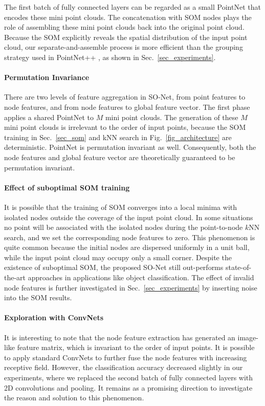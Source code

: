 \documentclass[10pt,twocolumn,letterpaper]{article}
\begin{document}
The first batch of fully connected layers can be regarded as a small PointNet that encodes these mini point clouds. The concatenation with SOM nodes plays the role of assembling these mini point clouds back into the original point cloud. Because the SOM explicitly reveals the spatial distribution of the input point cloud, our separate-and-assemble process is more efficient than the grouping strategy used in PointNet++ \cite{qi2017pointnet++}, as shown in Sec.~\ref{sec_experiments}.

\paragraph{Permutation Invariance}
There are two levels of feature aggregation in SO-Net, from point features to node features, and from node features to global feature vector. The first phase applies a shared PointNet to $M$ mini point clouds. The generation of these $M$ mini point clouds is irrelevant to the order of input points, because the SOM training in Sec.~\ref{sec_som} and kNN search in Fig.~\ref{fig_architecture} are deterministic. PointNet \cite{qi2016pointnet} is permutation invariant as well. Consequently, both the node features and global feature vector are theoretically guaranteed to be permutation invariant.

\paragraph{Effect of suboptimal SOM training}
It is possible that the training of SOM converges into a local minima with isolated nodes outside the coverage of the input point cloud. In some situations no point will be associated with the isolated nodes during the point-to-node $k$NN search, and we set the corresponding node features to zero. This phenomenon is quite common because the initial nodes are dispersed uniformly in a unit ball, while the input point cloud may occupy only a small corner. Despite the existence of suboptimal SOM, the proposed SO-Net still out-performs state-of-the-art approaches in applications like object classification. The effect of invalid node features is further investigated in Sec.~\ref{sec_experiments} by inserting noise into the SOM results.

\paragraph{Exploration with ConvNets}
It is interesting to note that the node feature extraction has generated an image-like feature matrix, which is invariant to the order of input points. It is possible to apply standard ConvNets to further fuse the node features with increasing receptive field. However, the classification accuracy decreased slightly in our experiments, where we replaced the second batch of fully connected layers with 2D convolutions and pooling. It remains as a promising direction to investigate the reason and solution to this phenomenon.
\end{document}
